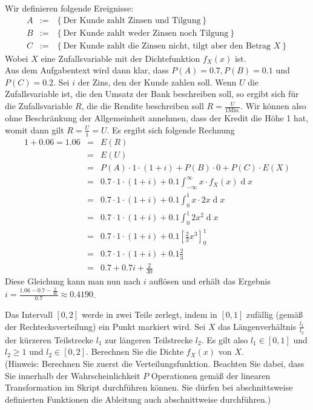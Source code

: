 \begin{Answer}
Wir definieren folgende Ereignisse:
\begin{eqnarray*}
	A&:=& \left\lbrace \text{Der Kunde zahlt Zinsen und Tilgung}\right\rbrace\\
	B&:=& \left\lbrace \text{Der Kunde zahlt weder Zinsen noch Tilgung}\right\rbrace\\
	C&:=& \left\lbrace \text{Der Kunde zahlt die Zinsen nicht, tilgt aber den Betrag } X\right\rbrace
\end{eqnarray*}
Wobei $X$ eine Zufallsvariable mit der Dichtefunktion $f_X(x)$ ist.\\
Aus dem Aufgabentext wird dann klar, dass $P(A)=0.7, P(B)=0.1$ und $P(C)=0.2$.
Sei $i$ der Zins, den der Kunde zahlen soll. Wenn $U$ die Zufallsvariable ist, die den Umsatz der Bank beschreiben soll, so ergibt sich für die Zufallsvariable $R$, die die Rendite beschreiben soll $R=\frac{U}{1 \text{Mio.}}$. Wir können also ohne Beschränkung der Allgemeinheit annehmen, dass der Kredit die Höhe 1 hat, womit dann gilt $R=\frac{U}{1}=U$. Es ergibt sich folgende Rechnung
\begin{eqnarray*}
	1+0.06=1.06&=&E(R)\\
	&=&E(U)\\
	&=&P(A)\cdot 1 \cdot (1+i)+P(B)\cdot 0+P(C) \cdot E(X)\\
	&=&0.7\cdot 1 \cdot (1+i)+0.1 \int_{-\infty}^\infty x\cdot  f_X(x)\operatorname{d}x\\
	&=&0.7\cdot 1 \cdot (1+i)+0.1 \int_{0}^1 x\cdot 2x\operatorname{d}x\\
	&=&0.7\cdot 1 \cdot (1+i)+0.1 \int_{0}^1  2x^2\operatorname{d}x\\
	&=&0.7\cdot 1 \cdot (1+i)+0.1 \left[ \frac{2}{3}x^3\right]_0^1\\
	&=&0.7\cdot 1 \cdot (1+i)+0.1\frac{2}{3}\\
	&=&0.7+0.7i+\frac{2}{30}
\end{eqnarray*}
Diese Gleichung kann man nun nach $i$ auflösen und erhält das Ergebnis $i=\frac{1.06-0.7-\frac{2}{30}}{0.7}\approx 0.4190$.
\end{Answer}


\begin{Exercise}
	Das Intervall $\left[0,2\right]$ werde in zwei Teile zerlegt, indem in $\left[0,1\right]$ zufällig (gemäß der Rechtecksverteilung) ein Punkt markiert wird. Sei $X$ das Längenverhältnis $\frac{l_1}{l_2}$ der kürzeren Teilstrecke $l_1$ zur längeren Teilstrecke $l_2$. Es gilt also $l_1\in\left[0,1\right]$ und $l_2\geq1$ und $l_2\in\left[0,2\right]$. Berechnen Sie die Dichte $f_X(x)$ von $X$.\\
	(Hinweis: Berechnen Sie zuerst die Verteilungsfunktion. Beachten Sie dabei, dass Sie innerhalb der Wahrscheinlichkeit $P$ Operationen gemäß der linearen Transformation im Skript durchführen können. Sie dürfen bei abschnittsweise definierten Funktionen die Ableitung auch abschnittweise durchführen.)
\end{Exercise}

